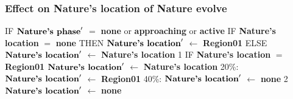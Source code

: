 \documentclass{article}%
\begin{document}
\subsubsection{Effect on Nature's location of Nature evolve}%
\label{ssubsec:Effect on Nature's location of Nature evolve}%
\begin{flushleft}%
IF %
$\mbox{\textbf{Nature's phase}} '$%
$=$%
\textbf{none}%
 or %
\textbf{approaching}%
 or %
\textbf{active}%
\linebreak%
\hspace*{2em}%
IF %
\textbf{Nature's location}%
$=$%
\textbf{none}%
\linebreak%
\hspace*{4em}%
THEN %
$\mbox{\textbf{Nature's location}} '$%
$\leftarrow$%
\textbf{Region01}%
\linebreak%
\hspace*{4em}%
ELSE %
$\mbox{\textbf{Nature's location}} '$%
$\leftarrow$%
\textbf{Nature's location}%
\linebreak%
\hspace*{2em}%
1 %
IF %
\textbf{Nature's location}%
$=$%
\textbf{Region01}%
\linebreak%
\hspace*{4em}%
$\mbox{\textbf{Nature's location}} '$%
$\leftarrow$%
\textbf{Nature's location}%
\linebreak%
\hspace*{4em}%
\linebreak%
\hspace*{6em}%
20\%: %
$\mbox{\textbf{Nature's location}} '$%
$\leftarrow$%
\textbf{Region01}%
\linebreak%
\hspace*{6em}%
40\%: %
$\mbox{\textbf{Nature's location}} '$%
$\leftarrow$%
\textbf{none}%
\linebreak%
\hspace*{2em}%
2 %
$\mbox{\textbf{Nature's location}} '$%
$\leftarrow$%
\textbf{none}%
\end{flushleft}

%
\end{document}
